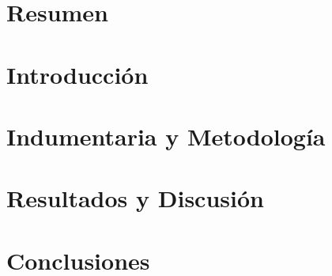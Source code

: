 \documentclass[12pt]{article}
\begin{document}
	

	\tableofcontents

	\listoffigures
	\listoftables

	\section{Resumen}
	

	\section{Introducción}
	

	\section{Indumentaria y Metodología}
	

	\section{Resultados y Discusión}
	

	\section{Conclusiones}
	

	
\end{document}
